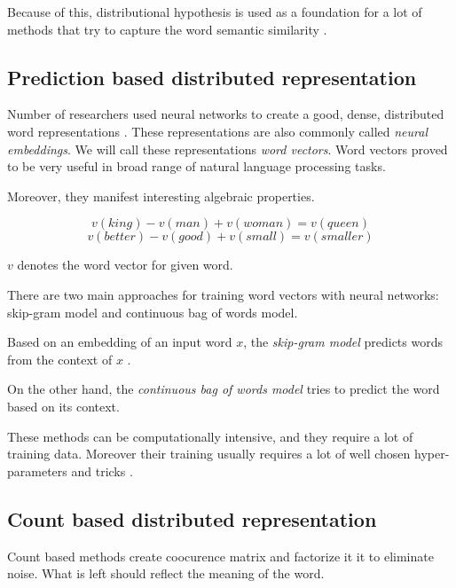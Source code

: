     Because of this, distributional hypothesis is used as a foundation for a lot of methods that try to capture the word semantic similarity \cite{rubenstein1965contextual}. 

    \subsection{Prediction based distributed representation}
    
    Number of researchers used neural networks to create a good, dense, distributed word representations \cite{pennington2014glove} \cite{DBLP:conf/icml/LeM14} \cite{rong2014word2vec}. %
    These representations are also commonly called \emph{neural embeddings}.
    We will call these representations \emph{word vectors}.
    Word vectors proved to be very useful in broad range of natural language processing tasks. 
    
    Moreover, they manifest interesting algebraic properties. 
    
    $$v(king) - v(man) + v(woman) = v(queen)$$
    $$v(better) - v(good) + v(small) = v(smaller)$$
    
    $v$ denotes the word vector for given word.
    
    There are two main approaches for training word vectors with neural networks: skip-gram model and continuous bag of words model.
    
    Based on an embedding of an input word $x$, the \textit{skip-gram model} predicts words from the context of $x$ .
    
    On the other hand, the \textit{continuous bag of words model} tries to predict the word based on its context.
    
    These methods can be computationally intensive, and they require a lot of training data. 
    Moreover their training usually requires a lot of well chosen hyper-parameters and tricks \cite{DBLP:journals/corr/MikolovSCCD13} \cite{vajdova2017}. %
    

    \subsection{Count based distributed representation}
    \* %
    
    Count based methods create coocurence matrix and factorize it it to eliminate noise. 
    What is left should reflect the meaning of the word. 
    
